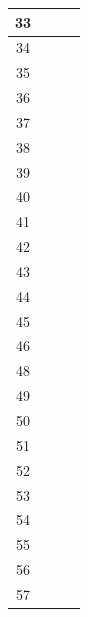 \documentclass[11pt, a4paper]{article}
\begin{document}
\begin{landscape}
\begin{longtable}{|c|c|c|c|}
       33&         &                 &                     \\ \hline
       34&         &                 &                    \\ \hline
       35&         &                 &                     \\ \hline
       36&         &                 &                    \\ \hline
       37&         &                 &                     \\ \hline
       38&         &                 &                    \\ \hline
       39&         &                 &                     \\ \hline
       40&         &                 &                    \\ \hline
       41&         &                 &                     \\ \hline
       42&         &                 &                    \\ \hline
       43&         &                 &                     \\ \hline
       44&         &                 &                    \\ \hline
       45&         &                 &                     \\ \hline
       46&         &                 &                    \\ \hline
       48&         &                 &                     \\ \hline
       49&         &                 &                    \\ \hline
       50&         &                 &                     \\ \hline
       51&         &                 &                    \\ \hline
       52&         &                 &                     \\ \hline
       53&         &                 &                    \\ \hline
       54&         &                 &                     \\ \hline
       55&         &                 &                    \\ \hline
       56&         &                 &                     \\ \hline
       57&         &                 &                    \\ \hline

\end{longtable}
\end{landscape}
\end{document}
